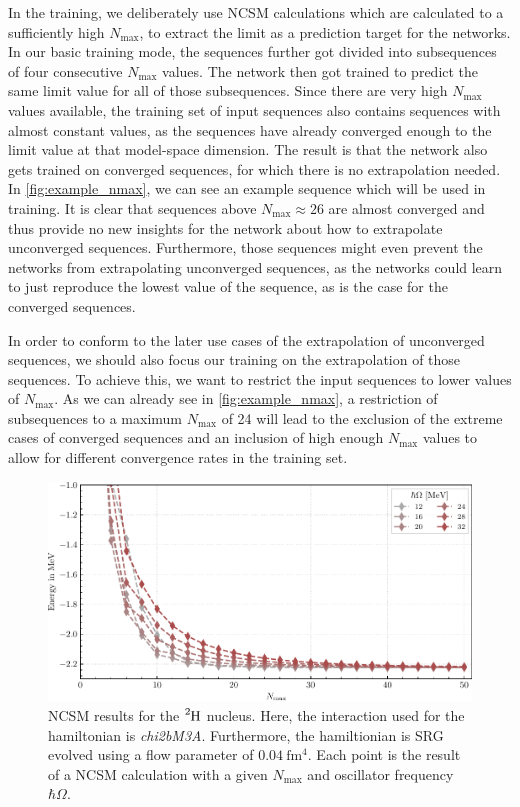In the training, we deliberately use NCSM calculations which are calculated to a sufficiently high $N_\mathrm{max}$, to extract the limit as a prediction target for the networks. In our basic training mode, the sequences further got divided into subsequences of four consecutive $N_\mathrm{max}$ values. The network then got trained to predict the same limit value for all of those subsequences. Since there are very high $N_\mathrm{max}$ values available, the training set of input sequences also contains sequences with almost constant values, as the sequences have already converged enough to the limit value at that model-space dimension. The result is that the network also gets trained on converged sequences, for which there is no extrapolation needed. In \autoref{fig:example_nmax}, we can see an example sequence which will be used in training. It is clear that sequences above $N_\mathrm{max} \approx 26$ are almost converged and thus provide no new insights for the network about how to extrapolate unconverged sequences. Furthermore, those sequences might even prevent the networks from extrapolating unconverged sequences, as the networks could learn to just reproduce the lowest value of the sequence, as is the case for the converged sequences.

In order to conform to the later use cases of the extrapolation of unconverged sequences, we should also focus our training on the extrapolation of those sequences. To achieve this, we want to restrict the input sequences to lower values of $N_\mathrm{max}$. As we can already see in \autoref{fig:example_nmax}, a restriction of subsequences to a maximum $N_\mathrm{max}$ of 24 will lead to the exclusion of the extreme cases of converged sequences and an inclusion of high enough $N_\mathrm{max}$ values to allow for different convergence rates in the training set.
\begin{figure}[H]
  \centering
  \includegraphics[width=\textwidth]{media/example_sequence.pdf}
  \caption{NCSM results for the $\n{2}{H}$ nucleus. Here, the interaction used for the hamiltonian is \textit{chi2bM3A}. Furthermore, the hamiltionian is SRG evolved using a flow parameter of $\SI{0.04}{\femto\metre^4}$. Each point is the result of a NCSM calculation with a given $N_\mathrm{max}$ and oscillator frequency $\hbar \Omega$.}
  \label{fig:example_nmax}
\end{figure}
